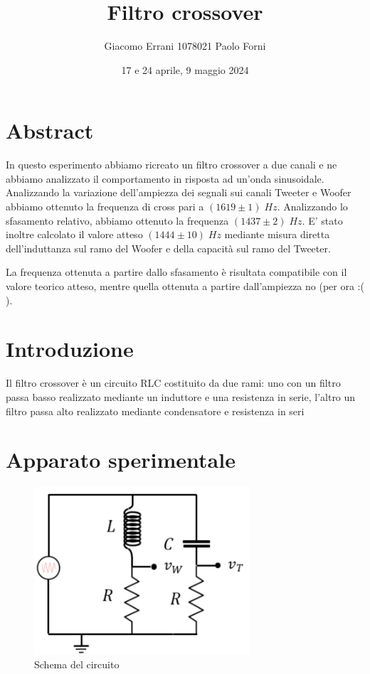 \documentclass[12pt,a4paper]{article}
\title{Filtro crossover} %
\date{17 e 24 aprile, 9 maggio 2024}
\author{Giacomo Errani 1078021 Paolo Forni}
\begin{document}
\newcommand{\theoryF}{ $(1444 \pm 10) \; Hz $}
\newcommand{\amplitudeF}{$(1619 \pm 1) \; Hz $}
\newcommand{\phaseF}{$(1437 \pm 2) \; Hz $}

\maketitle

\section{Abstract}

\indent In questo esperimento abbiamo ricreato un filtro crossover a due canali e ne abbiamo analizzato il comportamento in risposta ad un'onda sinusoidale. Analizzando la variazione dell'ampiezza dei segnali sui canali Tweeter e Woofer abbiamo ottenuto la frequenza di cross pari a \amplitudeF. Analizzando lo sfasamento relativo, abbiamo ottenuto la frequenza \phaseF. E' stato inoltre calcolato il valore atteso \theoryF \hspace{1pt} mediante misura diretta dell'induttanza sul ramo del Woofer e della capacità sul ramo del Tweeter. 

La frequenza ottenuta a partire dallo sfasamento è risultata compatibile con il valore teorico atteso, mentre quella ottenuta a partire dall'ampiezza no (per ora :( ).

\section{Introduzione}
Il filtro crossover è un circuito RLC costituito da due rami: uno con un filtro passa basso realizzato mediante un induttore e una resistenza in serie, l'altro un filtro passa alto realizzato mediante condensatore e resistenza in seri

\section{Apparato sperimentale}

\begin{figure}[H]
\centering
\includegraphics[width=8cm]{crossover_scheme.png}

\caption{Schema del circuito}
\label{Fig1}

\end{figure}
\end{document}

